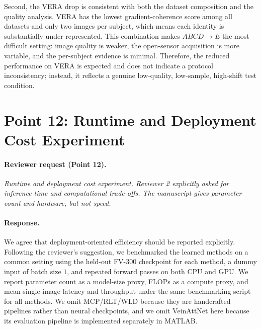 \documentclass[11pt]{article}
\begin{document}
Second, the VERA drop is consistent with both the dataset composition and the quality analysis. VERA has the lowest gradient-coherence score among all datasets and only two images per subject, which means each identity is substantially under-represented. This combination makes $ABCD \rightarrow E$ the most difficult setting: image quality is weaker, the open-sensor acquisition is more variable, and the per-subject evidence is minimal. Therefore, the reduced performance on VERA is expected and does not indicate a protocol inconsistency; instead, it reflects a genuine low-quality, low-sample, high-shift test condition.

\section*{Point 12: Runtime and Deployment Cost Experiment}

\paragraph{Reviewer request (Point 12).}
\emph{Runtime and deployment cost experiment. Reviewer 2 explicitly asked for inference time and computational trade-offs. The manuscript gives parameter count and hardware, but not speed.}

\paragraph{Response.}
We agree that deployment-oriented efficiency should be reported explicitly. Following the reviewer's suggestion, we benchmarked the learned methods on a common setting using the held-out FV-300 checkpoint for each method, a dummy input of batch size $1$, and repeated forward passes on both CPU and GPU. We report parameter count as a model-size proxy, FLOPs as a compute proxy, and mean single-image latency and throughput under the same benchmarking script for all methods. We omit MCP/RLT/WLD because they are handcrafted pipelines rather than neural checkpoints, and we omit VeinAttNet here because its evaluation pipeline is implemented separately in MATLAB.
\end{document}
